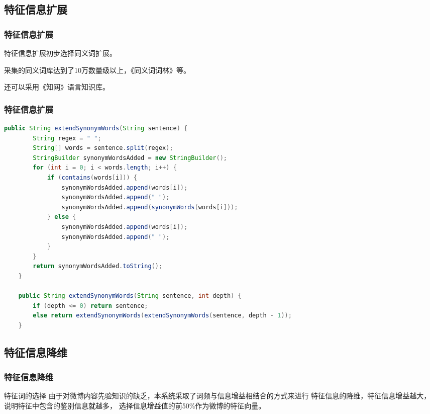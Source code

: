 \documentclass[CJKutf8, table]{beamer}
\begin{document}
\begin{CJK}{UTF8}{gbsn}
\subsection{特征信息扩展}
\begin{frame}
  \frametitle{特征信息扩展}
  \begin{block}{}
    特征信息扩展初步选择同义词扩展。
  \end{block}
  \begin{block}{}
   采集的同义词库达到了10万数量级以上，《同义词词林》等。
  \end{block}
  \begin{block}{}
    还可以采用《知网》语言知识库。
  \end{block}
\end{frame}

\begin{frame}[fragile]
  \frametitle{特征信息扩展}
  \lstset{language=Java,basicstyle=\ttfamily,commentstyle=\ttfamily}
  \begin{tiny}
    \begin{block}{}
      \begin{lstlisting}[language=Java]
    public String extendSynonymWords(String sentence) {
        String regex = " ";
        String[] words = sentence.split(regex);
        StringBuilder synonymWordsAdded = new StringBuilder();
        for (int i = 0; i < words.length; i++) {
            if (contains(words[i])) {
                synonymWordsAdded.append(words[i]);
                synonymWordsAdded.append(" ");
                synonymWordsAdded.append(synonymWords(words[i]));
            } else {
                synonymWordsAdded.append(words[i]);
                synonymWordsAdded.append(" ");
            }
        }
        return synonymWordsAdded.toString();
    }
    
    public String extendSynonymWords(String sentence, int depth) {
        if (depth <= 0) return sentence;
        else return extendSynonymWords(extendSynonymWords(sentence, depth - 1));
    }
      \end{lstlisting}
    \end{block}
  \end{tiny}
\end{frame}

\subsection{特征信息降维}
\begin{frame}
  \frametitle{特征信息降维}
  \begin{block}{特征词的选择}
    由于对微博内容先验知识的缺乏，本系统采取了词频与信息增益相结合的方式来进行
    特征信息的降维，特征信息增益越大，说明特征中包含的鉴别信息就越多，
    选择信息增益值的前50\%作为微博的特征向量。
  \end{block}


\end{frame}
\end{CJK}
\end{document}
